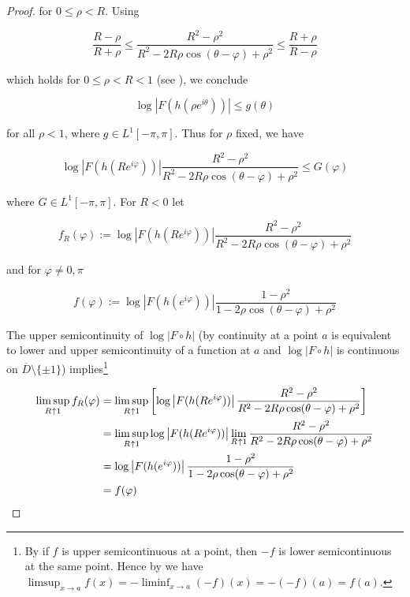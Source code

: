 \begin{proof}
for $0 \leqslant \rho < R$. Using 

\begin{equation*}
	\frac{R - \rho}{R + \rho} \leqslant \frac{R^2 - \rho^2}{R^2 - 2R\rho\cos(\theta - \varphi) + \rho^2} \leqslant \frac{R + \rho}{R - \rho}
\end{equation*}

which holds for $0 \leqslant \rho < R < 1$ (see \cite[236]{rudin:rc_analysis:1987}), we conclude

\begin{equation*}
	\log\left| F(h(\rho e^{i\theta}))\right| \leqslant g(\theta)
\end{equation*}

for all $\rho < 1$, where $g \in L^1[-\pi,\pi]$. Thus for $\rho$ fixed, we have 

\begin{equation*}
	\log\left| F(h(Re^{i\varphi}))\right| \frac{R^2 - \rho^2}{R^2 - 2R\rho\cos(\theta - \varphi) + \rho^2} \leqslant G(\varphi)
\end{equation*}

where $G \in L^1[-\pi,\pi]$. For $R < 0$ let

\begin{equation*}
	f_R(\varphi) := \log\left| F(h(Re^{i\varphi}))\right| \frac{R^2 - \rho^2}{R^2 - 2R\rho\cos(\theta - \varphi) + \rho^2}
\end{equation*}

and for $\varphi \neq 0,\pi$

\begin{equation*}
	f(\varphi) := \log\left| F(h(e^{i\varphi}))\right| \frac{1 - \rho^2}{1 - 2\rho\cos(\theta - \varphi) + \rho^2}
\end{equation*}

The upper semicontinuity of $\log\left| F \circ h\right|$ (by \cite[360]{bourbaki:general_topology:1995} continuity at a point $a$ is equivalent to lower and upper semicontinuity of a function at $a$ and $\log \left| F \circ h\right|$ is continuous on $\overline{D}\setminus \{\pm 1\}$) implies\footnote{
	By \cite[360]{bourbaki:general_topology:1995} if $f$ is upper semicontinuous at a point, then $-f$ is lower semicontinuous at the same point. Hence by \cite[363]{bourbaki:general_topology:1995} we have $\limsup_{x \to a} f(x) = -\liminf_{x \to a}\left( -f \right)(x) = -\left( -f \right)(a) = f(a)$.
}

\begin{equation*}
	\begin{aligned}
		\limsup_{R \toup 1}f_R(\varphi) &= \limsup_{R \toup 1} \left[ \log\left| F(h(Re^{i\varphi}))\right| \frac{R^2 - \rho^2}{R^2 - 2R\rho\cos(\theta - \varphi) + \rho^2}\right]\\
		&= \limsup_{R \toup 1} \log\left| F(h(Re^{i\varphi}))\right| \lim_{R \toup 1} \frac{R^2 - \rho^2}{R^2 - 2R\rho\cos(\theta - \varphi) + \rho^2}\\
		&= \log\left| F(h(e^{i\varphi}))\right| \frac{1 - \rho^2}{1 - 2\rho\cos(\theta - \varphi) + \rho^2}\\
		&= f(\varphi)
	\end{aligned}
\end{equation*}


\end{proof}
